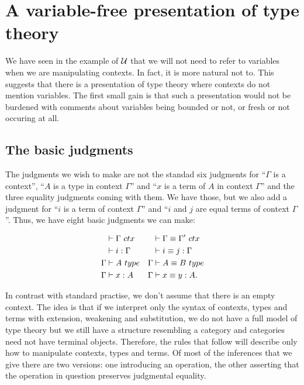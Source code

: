 \section{A variable-free presentation of type theory}
We have seen in the example of $\mathcal{U}$ that we will not need to refer to variables
when we are manipulating contexts. In fact, it is more natural not to.
This suggests that there is a presentation
of type theory where contexts do not mention variables. The first small gain is that such a presentation
would not be burdened with comments about variables being bounded or not, or fresh or
not occuring at all.

\subsection{The basic judgments}
The judgments we wish to make are not the standad six judgments for ``$\Gamma$ is a context'', ``$A$ is
a type in context $\Gamma$'' and ``$x$ is a term of $A$ in context $\Gamma$'' and the three equality
judgments coming with them. We have those, but we also add a judgment for ``$i$ is a term of context $\Gamma$''
and ``$i$ and $j$ are equal terms of context $\Gamma$''. Thus, we have eight basic judgments we can make:

\begin{align*}
\jctx*{\Gamma} & \jctxeq*{\Gamma}{\Gamma'}\\
\jtermc*{\Gamma}{i} & \jtermceq*{\Gamma}{i}{j}\\
\jtype*{\Gamma}{A} & \jtypeeq*{\Gamma}{A}{B}\\
\jterm*{\Gamma}{A}{x} & \jtermeq*{\Gamma}{A}{x}{y}.
\end{align*}

In contrast with standard practise, we don't assume that there is an empty context. The idea is that
if we interpret only the syntax of contexts, types and terms with extension, weakening and
substitution, we do not have a full model of type theory but we still have a 
structure resembling a category and categories need not have terminal objects. Therefore,
the rules that follow will describe only how to manipulate contexts, types and terms.
Of most of the inferences that we give there are two versions: one introducing an operation, the other asserting that the operation in question preserves judgmental equality. 

